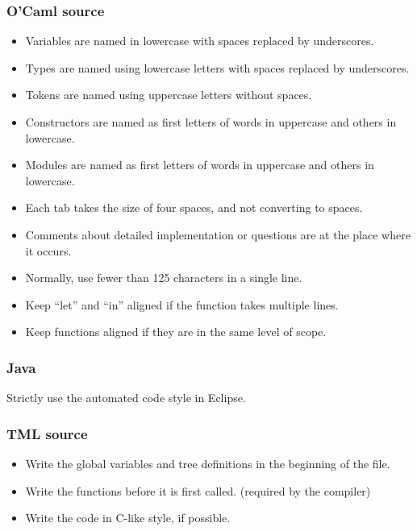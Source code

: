 \documentclass[12pt,psfig,a4]{article}
\begin{document}
\subsubsection{O'Caml source}
\begin{itemize}
\item Variables are named in lowercase with spaces replaced by underscores.

\item Types are named using lowercase letters with spaces replaced by underscores.

\item Tokens are named using uppercase letters without spaces.

\item Constructors are named as first letters of words in uppercase and others in lowercase.

\item Modules are named as first letters of words in uppercase and others in lowercase.

\item Each tab takes the size of four spaces, and not converting to spaces.

\item Comments about detailed implementation or questions are at the place where it occurs.

\item Normally, use fewer than 125 characters in a single line.

\item Keep ``let'' and ``in'' aligned if the function takes multiple lines.

\item Keep functions aligned if they are in the same level of scope.
\end{itemize}

\subsubsection{Java}
Strictly use the automated code style in Eclipse.

\subsubsection{TML source}
\begin{itemize}
\item Write the global variables and tree definitions in the beginning of the file.

\item Write the functions before it is first called. (required by the compiler)

\item Write the code in C-like style, if possible.
\end{itemize}
\end{document}
